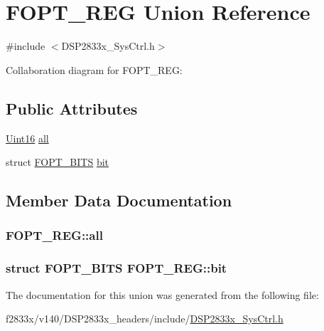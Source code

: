 \hypertarget{union_f_o_p_t___r_e_g}{}\section{F\+O\+P\+T\+\_\+\+R\+E\+G Union Reference}
\label{union_f_o_p_t___r_e_g}


{\ttfamily \#include $<$D\+S\+P2833x\+\_\+\+Sys\+Ctrl.\+h$>$}



Collaboration diagram for F\+O\+P\+T\+\_\+\+R\+E\+G\+:
\subsection*{Public Attributes}
\begin{DoxyCompactItemize}
\item 
\hyperlink{_d_s_p2833x___device_8h_a59a9f6be4562c327cbfb4f7e8e18f08b}{Uint16} \hyperlink{union_f_o_p_t___r_e_g_a9a76411d7be66de47078d5f5ba236842}{all}
\item 
struct \hyperlink{struct_f_o_p_t___b_i_t_s}{F\+O\+P\+T\+\_\+\+B\+I\+T\+S} \hyperlink{union_f_o_p_t___r_e_g_a1b186a871005bdd73900c43bd4aa45c9}{bit}
\end{DoxyCompactItemize}


\subsection{Member Data Documentation}
\hypertarget{union_f_o_p_t___r_e_g_a9a76411d7be66de47078d5f5ba236842}{}
\subsubsection[{all}]{ F\+O\+P\+T\+\_\+\+R\+E\+G\+::all}\label{union_f_o_p_t___r_e_g_a9a76411d7be66de47078d5f5ba236842}
\hypertarget{union_f_o_p_t___r_e_g_a1b186a871005bdd73900c43bd4aa45c9}{}
\subsubsection[{bit}]{\setlength{\rightskip}{0pt plus 5cm}struct {\bf F\+O\+P\+T\+\_\+\+B\+I\+T\+S} F\+O\+P\+T\+\_\+\+R\+E\+G\+::bit}\label{union_f_o_p_t___r_e_g_a1b186a871005bdd73900c43bd4aa45c9}


The documentation for this union was generated from the following file\+:\begin{DoxyCompactItemize}
\item 
f2833x/v140/\+D\+S\+P2833x\+\_\+headers/include/\hyperlink{_d_s_p2833x___sys_ctrl_8h}{D\+S\+P2833x\+\_\+\+Sys\+Ctrl.\+h}\end{DoxyCompactItemize}
